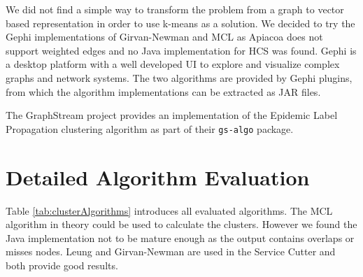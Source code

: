 We did not find a simple way to transform the problem from a graph to vector based representation in order to use k-means as a solution. We  decided to try the Gephi implementations of Girvan-Newman and MCL as Apiacoa does not support weighted edges and no Java implementation for HCS was found. Gephi is a desktop platform with a well developed \gls{UI} to explore and visualize complex graphs and network systems. The two algorithms are provided by Gephi plugins, from which the algorithm implementations can be extracted as \gls{JAR} files.

The GraphStream project provides an implementation of the Epidemic Label Propagation clustering algorithm as part of their \texttt{gs-algo} package.

\section{Detailed Algorithm Evaluation}
\label{appendix:graphClusteringAlgs}

Table \ref{tab:clusterAlgorithms} introduces all evaluated algorithms. The \gls{MCL} algorithm in theory could be used to calculate the clusters. However we found the Java implementation not to be mature enough as the output contains overlaps or misses nodes. Leung and Girvan-Newman are used in the Service Cutter and both provide good results.

